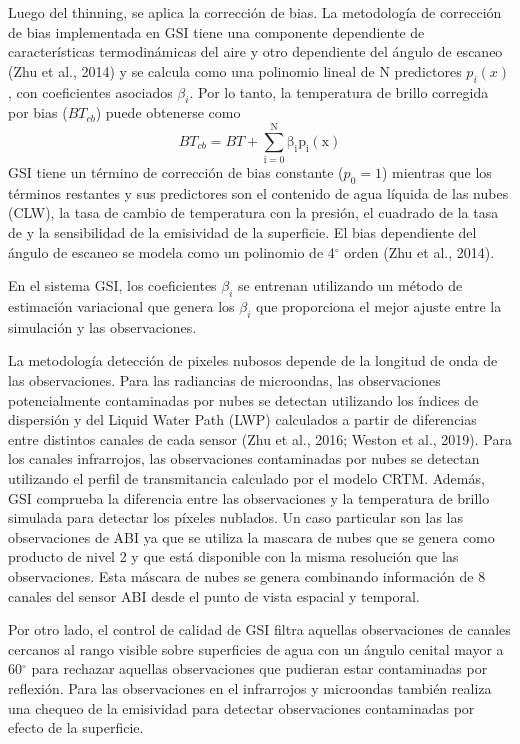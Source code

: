 \documentclass[12pt,oneside]{reedthesis}
\begin{document}
Luego del thinning, se aplica la corrección de bias. La metodología de corrección de bias implementada en GSI tiene una componente dependiente de características termodinámicas del aire y otro dependiente del ángulo de escaneo (Zhu et al., 2014) y se calcula como una polinomio lineal de N predictores \(p_i(x)\), con coeficientes asociados \(\beta_i\). Por lo tanto, la temperatura de brillo corregida por bias (\(BT_{cb}\)) puede obtenerse como
\begin{equation}
  \mathrm{\mathit{BT_{cb}} =\mathit{ BT} + \sum_{i = 0}^{N} \beta_i p_i (x)}
  \label{eq:eq12}
\end{equation}
GSI tiene un término de corrección de bias constante (\(p_0 = 1\)) mientras que los términos restantes y sus predictores son el contenido de agua líquida de las nubes (CLW), la tasa de cambio de temperatura con la presión, el cuadrado de la tasa de y la sensibilidad de la emisividad de la superficie. El bias dependiente del ángulo de escaneo se modela como un polinomio de 4\(^\circ\) orden (Zhu et al., 2014).

En el sistema GSI, los coeficientes \(\beta_i\) se entrenan utilizando un método de estimación variacional que genera los \(\beta_i\) que proporciona el mejor ajuste entre la simulación y las observaciones.

La metodología detección de pixeles nubosos depende de la longitud de onda de las observaciones. Para las radiancias de microondas, las observaciones potencialmente contaminadas por nubes se detectan utilizando los índices de dispersión y del Liquid Water Path (LWP) calculados a partir de diferencias entre distintos canales de cada sensor (Zhu et al., 2016; Weston et al., 2019). Para los canales infrarrojos, las observaciones contaminadas por nubes se detectan utilizando el perfil de transmitancia calculado por el modelo CRTM. Además, GSI comprueba la diferencia entre las observaciones y la temperatura de brillo simulada para detectar los píxeles nublados. Un caso particular son las las observaciones de ABI ya que se utiliza la mascara de nubes que se genera como producto de nivel 2 y que está disponible con la misma resolución que las observaciones. Esta máscara de nubes se genera combinando información de 8 canales del sensor ABI desde el punto de vista espacial y temporal.

Por otro lado, el control de calidad de GSI filtra aquellas observaciones de canales cercanos al rango visible sobre superficies de agua con un ángulo cenital mayor a 60\(^{\circ}\) para rechazar aquellas observaciones que pudieran estar contaminadas por reflexión. Para las observaciones en el infrarrojos y microondas también realiza una chequeo de la emisividad para detectar observaciones contaminadas por efecto de la superficie.
\end{document}
